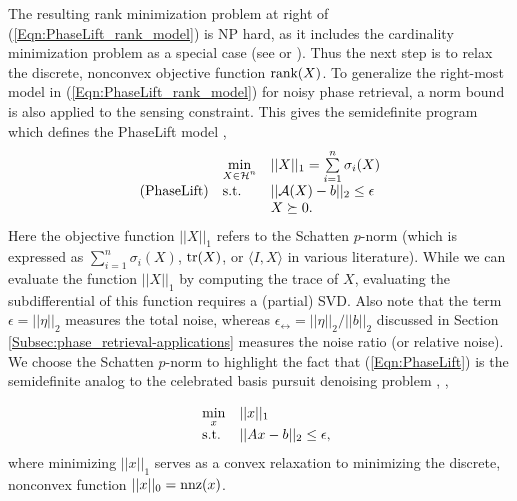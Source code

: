 The resulting rank minimization problem at right of (\ref{Eqn:PhaseLift_rank_model}) is NP hard, as it includes the cardinality minimization problem as a special case (see \cite{natarajan1995sparse} or  \cite{recht2010guaranteed}).  Thus the next step is to relax the discrete, nonconvex objective function $\textnormal{rank}(X)$.  To generalize the right-most model in (\ref{Eqn:PhaseLift_rank_model}) for noisy phase retrieval, a norm bound is also applied to the sensing constraint.  This gives the semidefinite program which defines the PhaseLift model \cite{DBLP:journals/siamis/CandesESV13}, \cite{candes2013phaselift}
\begin{equation} \label{Eqn:PhaseLift}
\begin{array}{lll}
	&	\min\limits_{\substack{X \in {\mathcal H}^n}}
		&	||X||_1 = \sum\limits_{\substack{i=1}}^{\substack{n}} \sigma_i(X)
			\\
\textnormal{(PhaseLift)}
	&	\textnormal{s.t.}
		& 	||{\mathcal A} (X) - b||_2 \leq \epsilon
			\\

	&
		&	X \succeq 0.

\end{array}
\end{equation}
Here the objective function $||X||_1$ refers to the Schatten $p$-norm (which is expressed as $\sum_{i=1}^n \sigma_i(X)$, $\mathrm{tr}(X)$, or $\langle I, X \rangle$ in various literature).
While we can evaluate the function $||X||_1$ by computing the trace of $X$, evaluating the subdifferential of this function requires a (partial) SVD.
Also note that the term $\epsilon = ||\eta||_2$ measures the total noise, whereas $\epsilon_\rel = ||\eta||_2 / ||b||_2$ discussed in Section \ref{Subsec:phase_retrieval-applications} measures the noise ratio (or relative noise).  We choose the Schatten $p$-norm to highlight the fact that (\ref{Eqn:PhaseLift}) is the semidefinite analog to the celebrated  basis pursuit denoising problem \cite{chen2001atomic}, \cite{candes2006stable},

\begin{equation}  			\label{Eqn:basis_pursuit}
\begin{array}{lll}
	&	\min\limits_{\substack{x}}
		&	||x||_1
			\\
	&	\textnormal{s.t.}
		&	||Ax-b||_2 \leq \epsilon,
\end{array}
\end{equation}
where minimizing $||x||_1$ serves as a convex relaxation to minimizing the discrete, nonconvex function $||x||_0 = \textnormal{nnz}(x)$.



